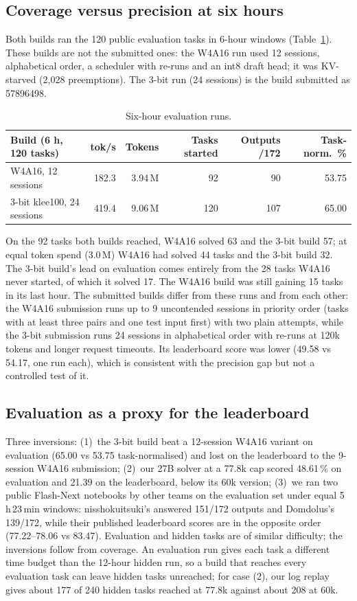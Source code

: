 \documentclass[11pt]{article}
\begin{document}
\subsection{Coverage versus precision at six hours}\label{sec:six}
Both builds ran the 120 public evaluation tasks in 6-hour windows (Table~\ref{tab:six}). These builds are not the submitted ones: the W4A16 run used 12 sessions, alphabetical order, a scheduler with re-runs and an int8 draft head; it was KV-starved (2{,}028 preemptions). The 3-bit run (24 sessions) is the build submitted as 57896498.
\begin{table}[tbp]
\centering\small
\begin{tabular}{@{}lrrrrr@{}}
\toprule
Build (6 h, 120 tasks) & tok/s & Tokens & Tasks started & Outputs /172 & Task-norm.\ \% \\
\midrule
W4A16, 12 sessions & 182.3 & 3.94\,M & 92 & 90 & 53.75 \\
3-bit klee100, 24 sessions & 419.4 & 9.06\,M & 120 & 107 & 65.00 \\
\bottomrule
\end{tabular}
\caption{Six-hour evaluation runs.}
\label{tab:six}
\end{table}
On the 92 tasks both builds reached, W4A16 solved 63 and the 3-bit build 57; at equal token spend (3.0\,M) W4A16 had solved 44 tasks and the 3-bit build 32. The 3-bit build's lead on evaluation comes entirely from the 28 tasks W4A16 never started, of which it solved 17. The W4A16 build was still gaining 15 tasks in its last hour.
The submitted builds differ from these runs and from each other: the W4A16 submission runs up to 9 uncontended sessions in priority order (tasks with at least three pairs and one test input first) with two plain attempts, while the 3-bit submission runs 24 sessions in alphabetical order with re-runs at 120k tokens and longer request timeouts. Its leaderboard score was lower (49.58 vs 54.17, one run each), which is consistent with the precision gap but not a controlled test of it.

\subsection{Evaluation as a proxy for the leaderboard}
Three inversions: (1)~the 3-bit build beat a 12-session W4A16 variant on evaluation (65.00 vs 53.75 task-normalised) and lost on the leaderboard to the 9-session W4A16 submission; (2)~our 27B solver at a 77.8k cap scored 48.61\,\% on evaluation and 21.39 on the leaderboard, below its 60k version; (3)~we ran two public Flash-Next notebooks by other teams on the evaluation set under equal 5\,h\,23\,min windows: nisshokuitsuki's \cite{ni2026} answered 151/172 outputs and Domdolus's \cite{domdolus2026} 139/172, while their published leaderboard scores are in the opposite order (77.22--78.06 vs 83.47). Evaluation and hidden tasks are of similar difficulty; the inversions follow from coverage. An evaluation run gives each task a different time budget than the 12-hour hidden run, so a build that reaches every evaluation task can leave hidden tasks unreached; for case (2), our log replay gives about 177 of 240 hidden tasks reached at 77.8k against about 208 at 60k.
\end{document}
